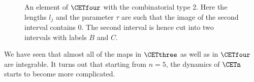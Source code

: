 \documentclass[12pt]{article}
\theoremstyle{definition}
\begin{document}
\begin{figure}
\caption[]{An element of $\CETfour$ with the combinatorial type 2. Here the lengths $l_j$ and the parameter $\tau$ are such that the image of the second interval contains $0$. The second interval is hence cut into two intervals with labels $B$ and $C$.}\label{fig:combinatorics_for_quadrilaterals}
\end{figure}

We have seen that almost all of the maps in $\CETthree$ as well as in $\CETfour$ are integrable. It turns out that starting from $n=5$, the dynamics of $\CETn$ starts to become more complicated.
\end{document}
